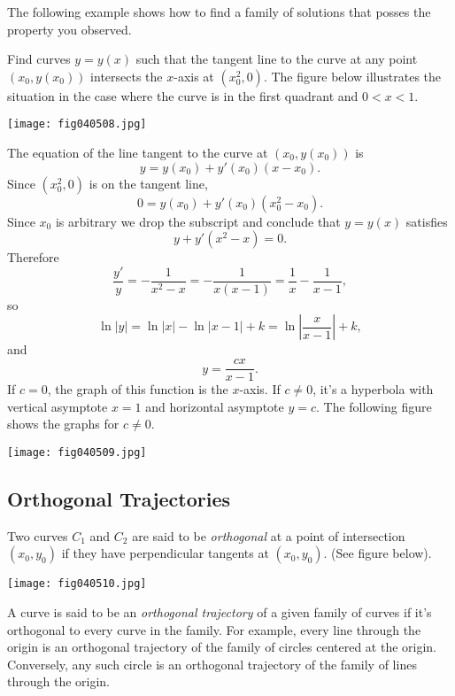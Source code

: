 \documentclass{ximera}
\begin{document}
 
The following example shows how to find a family of solutions that posses the property you observed. 
 
\begin{example}\label{example:4.5.8}
Find curves $y=y(x)$ such that the tangent line to the curve at any
point $(x_0,y(x_0))$ intersects the $x$-axis at $(x^2_0,0)$.
The figure below illustrates the situation in the case where
the curve is in the first quadrant and $0<x<1$.
 
 
\begin{image}
  \texttt{[image: fig040508.jpg]}
\end{image}
 
\begin{explanation}
The equation of the line tangent to the curve at $(x_0,y(x_0))$ is
$$
y=y(x_0)+y'(x_0)(x-x_0).
$$
Since $(x^2_0,0)$ is on the tangent line,
$$
0=y(x_0)+y'(x_0)(x^2_0-x_0).
$$
Since $x_0$ is arbitrary we drop the subscript and conclude that
$y=y(x)$ satisfies
$$
y+y'(x^2-x)=0.
$$
Therefore
$$
\frac{y'}{y}=-\frac{1}{x^2-x}=-\frac{1}{x(x-1)}=\frac{1}{x}-\frac{1}{x-1},
$$
so
$$
\ln|y|=\ln|x|-\ln|x-1|+k=
\ln\left|\frac{x}{x-1}\right|+k,
$$
and
$$
y=\frac{cx}{x-1}.
$$
If $c=0$, the graph of this function is the $x$-axis.   If $c\neq 0$, it's
a hyperbola with vertical asymptote $x=1$ and horizontal asymptote
$y=c$. The following figure shows the graphs for $c\neq 0$.
 
\begin{image}
  \texttt{[image: fig040509.jpg]}
\end{image}
\end{explanation}
\end{example}
 
 
\subsection*{Orthogonal Trajectories}
 
Two curves $C_1$ and $C_2$ are said to be \textit{orthogonal} at a
point of intersection $(x_0,y_0)$ if they have perpendicular tangents
at $(x_0,y_0)$. (See figure below).
 
\begin{image}
  \texttt{[image: fig040510.jpg]}
\end{image}
 
 
A curve is said to be an
\textit{orthogonal trajectory} of a given family of curves if it's
orthogonal to every curve in the family. For example, every line
through the origin is an orthogonal trajectory of the family of
circles centered at the origin.  Conversely,
any such circle is an orthogonal trajectory of the family of lines
through the origin.
 
\end{document}

